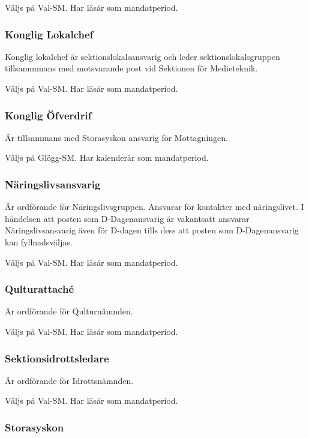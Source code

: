 \documentclass{dgovdoc}
\begin{document}
Väljs på Val-SM. Har läsår som mandatperiod.

\subsubsection{Konglig Lokalchef}

Konglig lokalchef är sektionslokalsansvarig och leder sektionslokalsgruppen
tillsammmans med motsvarande post vid Sektionen för Medieteknik.

Väljs på Val-SM. Har läsår som mandatperiod.

\subsubsection{Konglig Öfverdrif}

Är tillsammans med Storasyskon ansvarig för Mottagningen.

Väljs på Glögg-SM. Har kalenderår som mandatperiod.

\subsubsection{Näringslivsansvarig}

Är ordförande för Näringslivsgruppen. Ansvarar för kontakter med näringslivet. I händelsen att posten som D-Dagenansvarig är vakantsatt ansvarar Näringslivsansvarig även för D-dagen tills dess att posten som D-Dagenansvarig kan fyllnadsväljas.


Väljs på Val-SM. Har läsår som mandatperiod.

\subsubsection{Qulturattaché}

Är ordförande för Qulturnämnden.

Väljs på Val-SM. Har läsår som mandatperiod.

\subsubsection{Sektionsidrottsledare}

Är ordförande för Idrottsnämnden.

Väljs på Val-SM. Har läsår som mandatperiod.

\subsubsection{Storasyskon}
\end{document}

